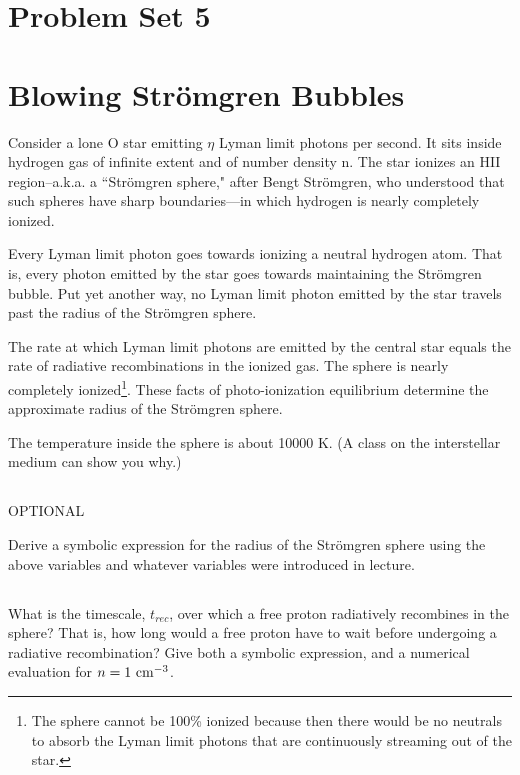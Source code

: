 \documentclass[11pt]{article}
\def\trec{{t_{rec}}}
\begin{document}
\pagestyle{empty}

\section*{\centering Problem Set 5}

\section{Blowing Str\"omgren Bubbles}\label{p2}

Consider a lone O star emitting $\eta$ Lyman limit photons per second. It sits
inside hydrogen gas of infinite extent and of number density n. The star
ionizes an HII region--a.k.a. a ``Str\"omgren sphere," after Bengt Str\"omgren, who
understood that such spheres have sharp boundaries—in which hydrogen is nearly
completely ionized.

Every Lyman limit photon goes towards ionizing a neutral hydrogen atom. That
is, every photon emitted by the star goes towards maintaining the Str\"omgren
bubble. Put yet another way, no Lyman limit photon emitted by the star travels
past the radius of the Str\"omgren sphere.

The rate at which Lyman limit photons are emitted by the central star equals
the rate of radiative recombinations in the ionized gas. The sphere is nearly
completely ionized\footnote{The
sphere cannot be 100\% ionized because then there would be no neutrals to
absorb the Lyman limit photons that are continuously streaming out of the star.}.
These facts of photo-ionization equilibrium determine the
approximate radius of the Str\"omgren sphere.

The temperature inside the sphere is about 10000 K. (A class on the interstellar medium can show you why.)

\subsection{} OPTIONAL

Derive a symbolic expression for the radius of the Str\"omgren sphere using the
above variables and whatever variables were introduced in lecture.

\subsection{}\label{p2partb}

What is the timescale, $\trec$, over which a free proton radiatively recombines in
the sphere? That is, how long would a free proton have to wait before
undergoing a radiative recombination? Give both a symbolic expression, and a
numerical evaluation for $n = 1~{\rm cm}^{-3}$.
\end{document}
